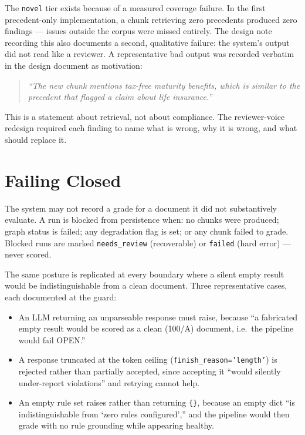 \documentclass[10pt]{article}
\newcommand{\code}[1]{\texttt{\small #1}}
\begin{document}
The \code{novel} tier exists because of a measured coverage failure. In the
first precedent-only implementation, a chunk retrieving zero precedents
produced zero findings --- issues outside the corpus were missed entirely. The
design note recording this also documents a second, qualitative failure: the
system's output did not read like a reviewer. A representative bad output was
recorded verbatim in the design document as motivation:

\begin{quote}\itshape
``The new chunk mentions tax-free maturity benefits, which is similar to the
precedent that flagged a claim about life insurance.''
\end{quote}

This is a statement about retrieval, not about compliance. The reviewer-voice
redesign required each finding to name what is wrong, why it is wrong, and what
should replace it.

\section{Failing Closed}
\label{sec:failclosed}

The system may not record a grade for a document it did not substantively
evaluate. A run is blocked from persistence when: no chunks were produced;
graph status is failed; any degradation flag is set; or any chunk failed to
grade. Blocked runs are marked \code{needs\_review} (recoverable) or
\code{failed} (hard error) --- never scored.

The same posture is replicated at every boundary where a silent empty result
would be indistinguishable from a clean document. Three representative cases,
each documented at the guard:

\begin{itemize}
  \item An LLM returning an unparseable response must raise, because ``a
        fabricated empty result would be scored as a clean (100/A) document,
        i.e.\ the pipeline would fail OPEN.''
  \item A response truncated at the token ceiling
        (\code{finish\_reason='length'}) is rejected rather than partially
        accepted, since accepting it ``would silently under-report violations''
        and retrying cannot help.
  \item An empty rule set raises rather than returning \code{\{\}}, because an
        empty dict ``is indistinguishable from `zero rules configured','' and
        the pipeline would then grade with no rule grounding while appearing
        healthy.
\end{itemize}
\end{document}

